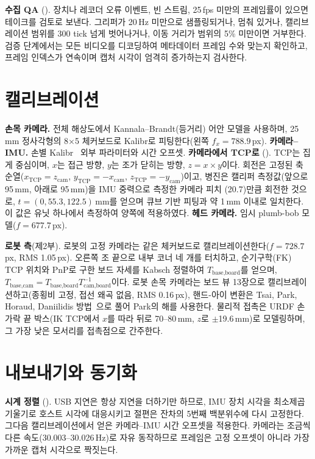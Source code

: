 \documentclass[conference,10pt]{IEEEtran}
\newcommand{\mm}{\,mm\xspace}
\begin{document}
\textbf{수집 QA} (). 장치나 레코더 오류 이벤트, 빈 스트림, 25\,fps 미만의 프레임률이 있으면 테이크를
검토로 보낸다. 그리퍼가 20\,Hz 미만으로 샘플링되거나, 멈춰 있거나, 캘리브레이션 범위를 300 tick 넘게 벗어나거나, 이동 거리가 범위의
5\% 미만이면 거부한다. 검증 단계에서는 모든 비디오를 디코딩하여 메타데이터 프레임 수와 맞는지 확인하고, 프레임 인덱스가 연속이며
캡처 시각이 엄격히 증가하는지 검사한다.

\section{캘리브레이션}\label{sec:cal}
\textbf{손목 카메라.} 전체 해상도에서 Kannala--Brandt(등거리) 어안 모델을 사용하며, 25\mm{} 정사각형의 8$\times$5 체커보드로
Kalibr로 피팅한다(왼쪽 $f_x{=}788.9$\,px). \textbf{카메라--IMU.} 손별 Kalibr~\cite{furgale2013kalibr} 외부 파라미터와 시간
오프셋. \textbf{카메라에서 TCP로} (). TCP는 집게 중심이며, $x$는 접근
방향, $y$는 조가 닫히는 방향, $z = x\times y$이다. 회전은 고정된 축 순열($x_\text{TCP}=z_\text{cam}$, $y_\text{TCP}=-x_\text{cam}$,
$z_\text{TCP}=-y_\text{cam}$)이고, 병진은 캘리퍼 측정값(앞으로 95\mm, 아래로 95\mm)을 IMU 중력으로 측정한 카메라 피치
(20.7\textdegree)만큼 회전한 것으로, $t=(0, 55.3, 122.5)$\mm{}를 얻으며 큐브 기반 피팅과 약 1\mm{} 이내로 일치한다. 이 값은
유닛 하나에서 측정하여 양쪽에 적용하였다. \textbf{헤드 카메라.} 임시 plumb-bob 모델($f=677.7$\,px).

\textbf{로봇 측}(제2부). 로봇의 고정 카메라는 같은 체커보드로 캘리브레이션한다($f=728.7$\,px, RMS 1.05\,px). 오른쪽 조 끝으로
내부 코너 네 개를 터치하고, 순기구학(FK) TCP 위치와 PnP로 구한 보드 자세를 Kabsch 정렬하여 $T_\text{base,board}$를 얻으며,
$T_\text{base,cam}=T_\text{base,board}T_\text{cam,board}^{-1}$이다. 로봇 손목 카메라는 보드 뷰 13장으로 캘리브레이션하고(종횡비
고정, 접선 왜곡 없음, RMS 0.16\,px), 핸드-아이 변환은 Tsai, Park, Horaud, Daniilidis 방법~\cite{tsai1989handeye}으로 풀어 Park의
해를 사용한다. 물리적 접촉은 URDF 손가락 끝 박스(IK TCP에서 $x$를 따라 뒤로 70--80\mm, $z$로 $\pm$19.6\mm)로 모델링하며, 그
가장 낮은 모서리를 접촉점으로 간주한다.

\section{내보내기와 동기화}\label{sec:export}
\textbf{시계 정렬} (). USB 지연은 항상 지연을 더하기만 하므로, IMU 장치 시각을 최소제곱 기울기로 호스트 시각에
대응시키고 절편은 잔차의 5번째 백분위수에 다시 고정한다. 그다음 캘리브레이션에서 얻은 카메라--IMU 시간 오프셋을 적용한다. 카메라는
조금씩 다른 속도(30.003--30.026\,Hz)로 자유 동작하므로 프레임은 고정 오프셋이 아니라 가장 가까운 캡처 시각으로 짝짓는다.
\end{document}
